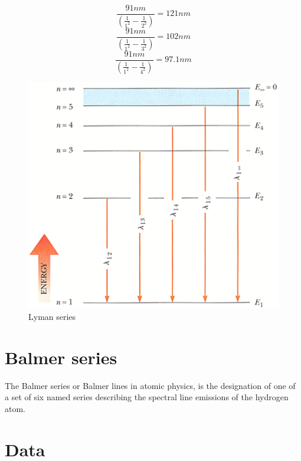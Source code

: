 \documentclass{article}
\begin{document}
  $$\frac{91nm}{(\frac{1}{1^2}-\frac{1}{2^2})}=121nm $$
  $$\frac{91nm}{(\frac{1}{1^2}-\frac{1}{3^2})}=102nm $$
  $$\frac{91nm}{(\frac{1}{1^2}-\frac{1}{4^2})}=97.1nm $$
  
 \begin{figure}[h!]
\centering
\includegraphics[scale=1]{3.png}
\caption{Lyman series}
\label{fig:univerise}
\end{figure}

 
  
\section{Balmer series}
The Balmer series or Balmer lines in atomic physics, is the designation of one of a set of six named series describing the spectral line emissions of the hydrogen atom.

\section{Data}
\begin{table}[htbp]
\begin{center}
\footnotesize
{}
\end{center}
  \caption{Balmer series}
  \label{tab:font-sizes}
\end{table}
\end{document}
